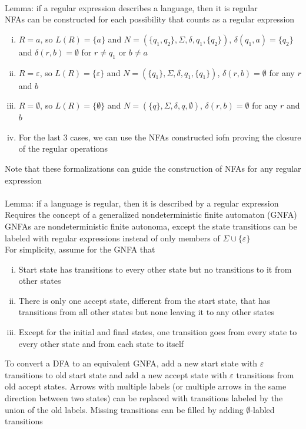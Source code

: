 \documentclass{article}
\newcommand*{\<}{\langle}
\renewcommand*{\>}{\rangle}
\begin{document}
			\\
			Lemma: if a regular expression describes a language, then it is regular \\
			NFAs can be constructed for each possibility that counts as a regular expression
			\begin{enumerate}[(i)]
				\item $R = a$, so $L(R) = \{a\}$ and $N = (\{q_1, q_2\}, \Sigma, \delta, q_1, \{q_2\})$, $\delta(q_1, a) = \{q_2\}$ and $\delta(r, b) = \emptyset$ for $r \neq q_1$ or $b \neq a$
				\item $R = \varepsilon$, so $L(R) = \{\varepsilon\}$ and $N = (\{q_1\}, \Sigma, \delta, q_1, \{q_1\})$, $\delta(r, b) = \emptyset$ for any $r$ and $b$
				\item $R = \emptyset$, so $L(R) = \{\emptyset\}$ and $N = (\{q\}, \Sigma, \delta, q, \emptyset)$, $\delta(r, b) = \emptyset$ for any $r$ and $b$
				\item For the last 3 cases, we can use the NFAs constructed iofn proving the closure of the regular operations
				\end{enumerate}
			Note that these formalizations can guide the construction of NFAs for any regular expression \\
			\\
			Lemma: if a language is regular, then it is described by a regular expression \\
			Requires the concept of a generalized nondeterministic finite automaton (GNFA) \\
			GNFAs are nondeterministic finite autonoma, except the state transitions can be labeled with regular expressions instead of only members of $\Sigma \cup \{\varepsilon\}$ \\
			For simplicity, assume for the GNFA that
			\begin{enumerate}[(i)]
				\item Start state has transitions to every other state but no transitions to it from other states
				\item There is only one accept state, different from the start state, that has transitions from all other states but none leaving it to any other states
				\item Except for the initial and final states, one transition goes from every state to every other state and from each state to itself
				\end{enumerate}
			To convert a DFA to an equivalent GNFA, add a new start state with $\varepsilon$ transitions to old start state and add a new accept state with $\varepsilon$ transitions from old accept states. Arrows with multiple labels (or multiple arrows in the same direction between two states) can be replaced with transitions labeled by the union of the old labels. Missing transitions can be filled by adding $\emptyset$-labled transitions \\
\end{document}

